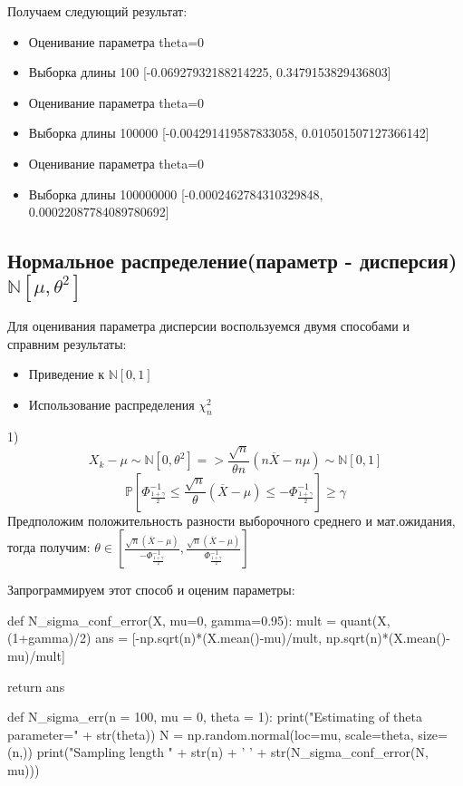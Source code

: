 \documentclass{article}
\begin{document}
Получаем следующий результат:
\begin{itemize}
	\item Оценивание параметра theta=0
	\item Выборка длины 100 [-0.06927932188214225, 0.3479153829436803]
	\item Оценивание параметра theta=0
	\item Выборка длины 100000 [-0.004291419587833058, 0.010501507127366142]
	\item Оценивание параметра theta=0
	\item Выборка длины 100000000 [-0.0002462784310329848, 0.00022087784089780692]
\end{itemize}
\subsection{Нормальное распределение(параметр - дисперсия) $\mathbb{N}\left[\mu, \theta^2\right]$}

Для оценивания параметра дисперсии воспользуемся двумя способами и справним результаты:
\begin{itemize}
	\item Приведение к $\mathbb{N}[0, 1]$
	\item Использование распределения $\mathbb{\chi}^2_n$
\end{itemize}
1) \[X_k-\mu\sim\mathbb{N}[0, \theta^2] => \frac{\sqrt{n}}{\theta n}\left(n\overline{X}-n\mu\right)\sim\mathbb{N}[0, 1]\]
\[\mathbb{P}\left[\Phi^{-1}_{\frac{1+\gamma}{2}}\le\frac{\sqrt{n}}{\theta}\left(\overline{X}-\mu\right)\le-\Phi^{-1}_{\frac{1+\gamma}{2}}\right]\ge\gamma\]
Предположим положительность разности выборочного среднего и мат.ожидания, тогда получим:
$\theta \in \left[\frac{\sqrt{n}(\overline{X}-\mu)}{-\Phi^{-1}_{\frac{1+\gamma}{2}}}, \frac{\sqrt{n}(\overline{X}-\mu)}{\Phi^{-1}_{\frac{1+\gamma}{2}}}\right]$

Запрограммируем этот способ и оценим параметры:

\begin{python}
def N_sigma_conf_error(X, mu=0, gamma=0.95):
	mult = quant(X, (1+gamma)/2)
	ans = [-np.sqrt(n)*(X.mean()-mu)/mult, np.sqrt(n)*(X.mean()-mu)/mult]

	return ans

def N_sigma_err(n = 100, mu = 0, theta = 1):
	print("Estimating of theta parameter=" + str(theta))
	N = np.random.normal(loc=mu, scale=theta, size=(n,))
	print("Sampling length " + str(n) + ' ' + 
		str(N_sigma_conf_error(N, mu)))
\end{python}
\end{document}
